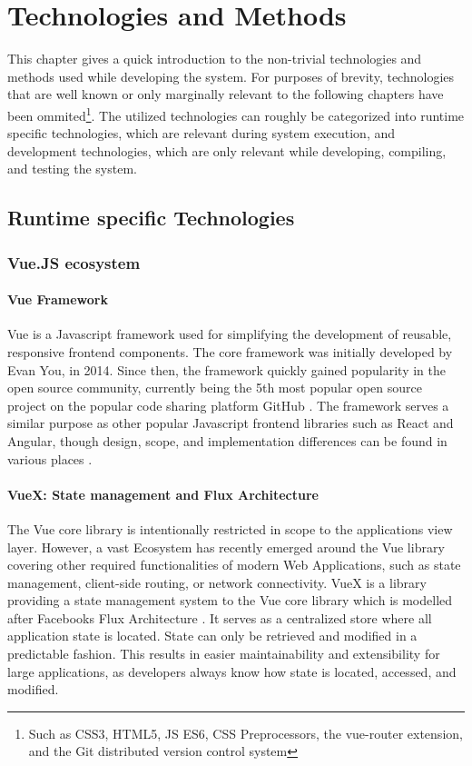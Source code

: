 \chapter{Technologies and Methods}
\label{sec:tech_and_methods}
This chapter gives a quick introduction to the non-trivial technologies and methods used while developing the system. For purposes of brevity, technologies that are well known or only marginally relevant to the following chapters have been ommited\footnote{Such as CSS3, HTML5, JS ES6, CSS Preprocessors, the vue-router extension, and the Git distributed version control system}. The utilized technologies can roughly be categorized into runtime specific technologies, which are relevant during system execution, and development technologies, which are only relevant while developing, compiling, and testing the system. 
\section{Runtime specific Technologies}
\subsection{Vue.JS ecosystem}
\subsubsection{Vue Framework}
Vue is a Javascript framework used for simplifying the development of reusable, responsive frontend components. The core framework was initially developed by Evan You, in 2014. Since then, the framework quickly gained popularity in the open source community, currently being the 5th most popular open source project on the popular code sharing platform GitHub \cite{GitHubMostStars}. The framework serves a similar purpose as other popular Javascript frontend libraries such as React and Angular, though design, scope, and implementation differences can be found in various places \cite{VueComparisonOtherFrameworks}.
\subsubsection{VueX: State management and Flux Architecture}
The Vue core library is intentionally restricted in scope to the applications view layer. However, a vast Ecosystem has recently emerged around the Vue library covering other required functionalities of modern Web Applications, such as state management, client-side routing, or network connectivity. VueX is a library providing a state management system to the Vue core library which is modelled after Facebooks Flux Architecture \cite{Vuex}\cite{FacebookFlux}. It serves as a centralized store where all application state is located. State can only be retrieved and modified in a predictable fashion. This results in easier maintainability and extensibility for large applications, as developers always know how state is located, accessed, and modified.
